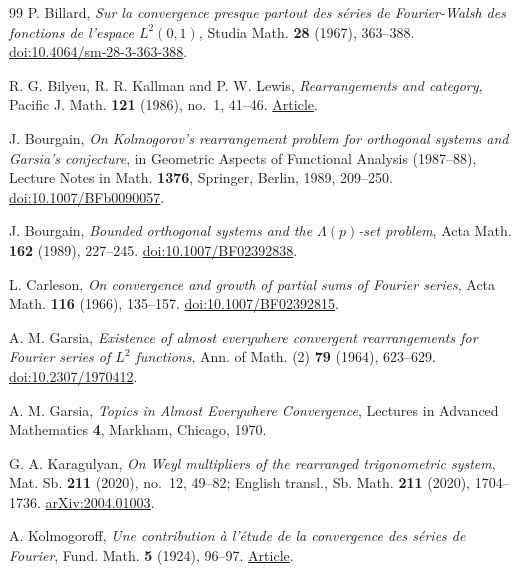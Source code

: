 \documentclass[11pt]{article}
\theoremstyle{remark}
\numberwithin{equation}{section}
\begin{document}
\begingroup
\small
\begin{thebibliography}{99}
\setlength{\itemsep}{0pt}
P. Billard, \emph{Sur la convergence presque partout des s\'eries de Fourier-Walsh des fonctions de l'espace $L^2(0,1)$}, Studia Math. \textbf{28} (1967), 363--388.
\href{https://doi.org/10.4064/sm-28-3-363-388}{doi:10.4064/sm-28-3-363-388}.

R. G. Bilyeu, R. R. Kallman and P. W. Lewis,
\emph{Rearrangements and category}, Pacific J. Math. \textbf{121} (1986), no.~1, 41--46.
\href{https://msp.org/pjm/1986/121-1/pjm-v121-n1-p04-s.pdf}{Article}.

J. Bourgain, \emph{On Kolmogorov's rearrangement problem for orthogonal systems and Garsia's conjecture}, in Geometric Aspects of Functional Analysis (1987--88), Lecture Notes in Math. \textbf{1376}, Springer, Berlin, 1989, 209--250.
\href{https://doi.org/10.1007/BFb0090057}{doi:10.1007/BFb0090057}.

J. Bourgain, \emph{Bounded orthogonal systems and the $\Lambda(p)$-set problem}, Acta Math. \textbf{162} (1989), 227--245.
\href{https://doi.org/10.1007/BF02392838}{doi:10.1007/BF02392838}.

L. Carleson, \emph{On convergence and growth of partial sums of Fourier series}, Acta Math. \textbf{116} (1966), 135--157.
\href{https://doi.org/10.1007/BF02392815}{doi:10.1007/BF02392815}.

A. M. Garsia, \emph{Existence of almost everywhere convergent rearrangements for Fourier series of $L^2$ functions}, Ann. of Math. (2) \textbf{79} (1964), 623--629.
\href{https://doi.org/10.2307/1970412}{doi:10.2307/1970412}.

A. M. Garsia, \emph{Topics in Almost Everywhere Convergence}, Lectures in Advanced Mathematics \textbf{4}, Markham, Chicago, 1970.

G. A. Karagulyan, \emph{On Weyl multipliers of the rearranged trigonometric system}, Mat. Sb. \textbf{211} (2020), no.~12, 49--82; English transl., Sb. Math. \textbf{211} (2020), 1704--1736.
\href{https://arxiv.org/abs/2004.01003}{arXiv:2004.01003}.

A. Kolmogoroff, \emph{Une contribution \`a l'\'etude de la convergence des s\'eries de Fourier}, Fund. Math. \textbf{5} (1924), 96--97.
\href{https://matwbn.icm.edu.pl/ksiazki/fm/fm5/fm5111.pdf}{Article}.


\end{thebibliography}
\end{document}
